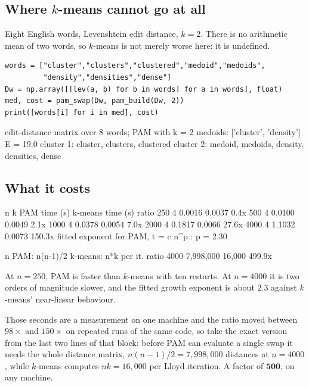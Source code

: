 \documentclass[11pt]{article}
\begin{document}
\subsection{Where $k$-means cannot go at all}

Eight English words, Levenshtein edit distance, $k=2$. There is no arithmetic
mean of two words, so $k$-means is not merely worse here: it is undefined.

\begin{lstlisting}
words = ["cluster","clusters","clustered","medoid","medoids",
         "density","densities","dense"]
Dw = np.array([[lev(a, b) for b in words] for a in words], float)
med, cost = pam_swap(Dw, pam_build(Dw, 2))
print([words[i] for i in med], cost)
\end{lstlisting}
\begin{codeout}
edit-distance matrix over 8 words; PAM with k = 2
  medoids: ['cluster', 'density']   E = 19.0
  cluster 1: cluster, clusters, clustered
  cluster 2: medoid, medoids, density, densities, dense
\end{codeout}

\subsection{What it costs}

\begin{codeout}
     n    k   PAM time (s)   k-means time (s)    ratio
   250    4        0.0016            0.0037           0.4x
   500    4        0.0100            0.0049           2.1x
  1000    4        0.0378            0.0054           7.0x
  2000    4        0.1817            0.0066          27.6x
  4000    4        1.1032            0.0073         150.3x
  fitted exponent for PAM,  t = c n^p :  p = 2.30

       n      PAM: n(n-1)/2 k-means: n*k per it.        ratio
    4000          7,998,000               16,000       499.9x
\end{codeout}

At $n = 250$, PAM is faster than $k$-means with ten restarts. At $n = 4000$ it
is two orders of magnitude slower, and the fitted growth exponent is about
$2.3$ against $k$-means' near-linear behaviour.

Those seconds are a measurement on one machine and the ratio moved between
$98\times$ and $150\times$ on repeated runs of the same code, so take the
exact version from the last two lines of that block: before PAM can evaluate a
single swap it needs the whole distance matrix, $n(n-1)/2 = 7{,}998{,}000$
distances at $n = 4000$, while $k$-means computes $nk = 16{,}000$ per Lloyd
iteration. A factor of $\mathbf{500}$, on any machine.
\end{document}
